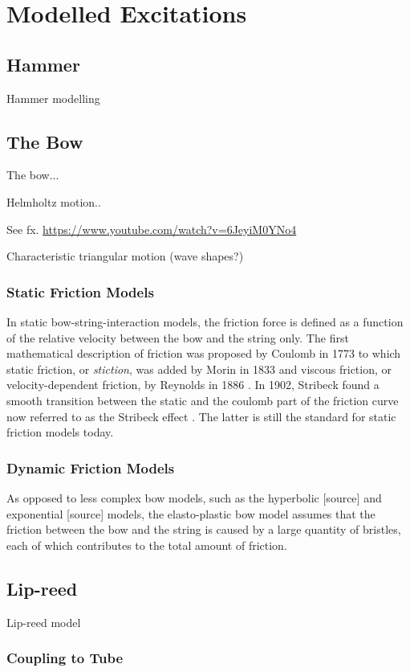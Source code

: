 \chapter{Modelled Excitations}\label{ch:bowModels}

\section{Hammer}
Hammer modelling

\section{The Bow}
The bow...

Helmholtz motion..

See fx. \url{https://www.youtube.com/watch?v=6JeyiM0YNo4}

Characteristic triangular motion (wave shapes?)

\subsection{Static Friction Models}
In static bow-string-interaction models, the friction force is defined as a function of the relative velocity between the bow and the string only.
The first mathematical description of friction was proposed by Coulomb in 1773 \cite{Coulomb} to which static friction, or \textit{stiction}, was added by Morin in 1833 \cite{Morin1833} and viscous friction, or velocity-dependent friction, by Reynolds in 1886 \cite{Reynolds1886}. In 1902, Stribeck found a smooth transition between the static and the coulomb part of the friction curve now referred to as the Stribeck effect \cite{Stribeck1902}. The latter is still the standard for static friction models today.

\subsection{Dynamic Friction Models}
As opposed to less complex bow models, such as the hyperbolic [source] and exponential [source] models, the elasto-plastic bow model assumes that the friction between the bow and the string is caused by a large quantity of bristles, each of which contributes to the total amount of friction.

\section{Lip-reed}
Lip-reed model


\subsection{Coupling to Tube}